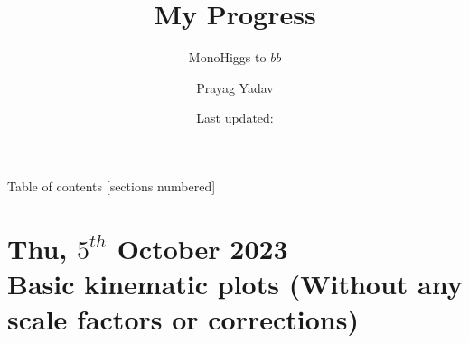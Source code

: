 \documentclass[10pt,xcolor=dvipsnames]{beamer}
\title{My Progress}
\subtitle{MonoHiggs to $b \bar{b}$}
\author{Prayag Yadav}
\institute{University of Hyderabad}
\date{Last updated: \DTMnow{}}
\begin{document}
  \maketitle

  \begin{frame}{Table of contents}
    [sections numbered]
    \tableofcontents%
  \end{frame}


  \section[Basic kinematic plots ]{\small{Thu, $5^{th}$ October 2023 } \\ Basic kinematic plots \tiny{(Without any scale factors or corrections)} }

\end{document}

